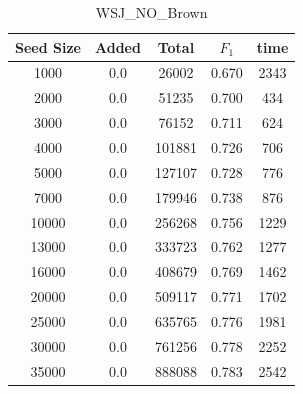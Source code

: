 \documentclass[journal, a4paper]{IEEEtran}
\begin{document}
	\begin{table}[!hbt]
		\begin{center}
		\caption{WSJ\_NO\_Brown}
		\label{tab:2}
		\begin{tabular}{|c|c|c|c|c|}
			\hline
			Seed Size & Added & Total & $F_{1}$ & time\\ \hline
			  1000  & 0.0 & 26002 & 0.670 & 2343\\ \hline
			  2000  & 0.0 & 51235 & 0.700 & 434\\ \hline
			  3000  & 0.0 & 76152 & 0.711 & 624\\ \hline
			  4000  & 0.0 & 101881 & 0.726 & 706\\ \hline
			  5000  & 0.0 & 127107 & 0.728 & 776\\ \hline
			  7000  & 0.0 & 179946 & 0.738 & 876\\ \hline
			  10000  & 0.0 & 256268 & 0.756 & 1229\\ \hline
			  13000  & 0.0 & 333723 & 0.762 & 1277\\ \hline
			  16000  & 0.0 & 408679 & 0.769 & 1462\\ \hline
			  20000  & 0.0 & 509117 & 0.771 & 1702\\ \hline
			  25000  & 0.0 & 635765 & 0.776 & 1981\\ \hline
			  30000  & 0.0 & 761256 & 0.778 & 2252\\ \hline
			  35000  & 0.0 & 888088 & 0.783 & 2542\\
			 \hline
		\end{tabular}
		\end{center}
		\vspace{-5mm}
	\end{table}
	
\end{document}
